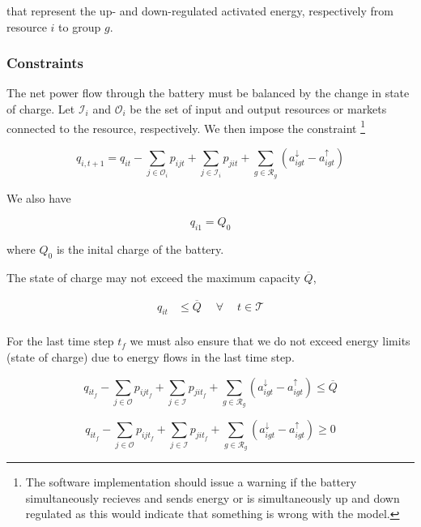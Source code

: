 \documentclass[]{report}
\newcommand{\resourcesg}{\mathcal{R}_g}
\newcommand{\timesteps}{\mathcal{T}}
\newcommand{\outputs}{\mathcal{O}}
\newcommand{\inputs}{\mathcal{I}}
\newcommand{\soc}{q}
\newcommand{\socinit}{Q_0}
\newcommand{\socmax}{\overline{Q}}
\newcommand{\socmin}{\underbar{Q}}
\newcommand{\aup}{a^{\uparrow}}
\newcommand{\adown}{a^{\downarrow}}
\let\oldforall\forall
\renewcommand{\forall}{\; \oldforall \: }
\begin{document}
that represent the up- and down-regulated activated energy, respectively from resource $i$ to group $g$.

\subsubsection*{Constraints}
The net power flow through the battery must be balanced by the change in state of charge. Let $\inputs_i$ and $\outputs_i$ be the set of input and output resources or markets connected to the resource, respectively. We then impose the constraint
\footnote{The software implementation should issue a warning if the battery simultaneously recieves and sends energy or is simultaneously up and down regulated as this would indicate that something is wrong with the model.}

\begin{equation}
    \label{eq:battery-energy-balance}
    \soc_{i,t+1} = \soc_{it} - \sum_{j \in \outputs_i} p_{ijt} + \sum_{j \in \inputs_i} p_{jit} + \sum_{g \in \resourcesg} (\adown_{igt} - \aup_{igt})
\end{equation}

We also have

\begin{equation}
    \soc_{i1} = \socinit
\end{equation}

where $\socinit$ is the inital charge of the battery.

The state of charge may not exceed the maximum capacity $\socmax$,

\begin{align}
    \soc_{it} &\leq \socmax \quad \forall \quad t \in \timesteps \\
\end{align}


For the last time step $t_f$ we must also ensure that we do not exceed energy limits (state of charge) due to energy flows in the last time step.

\begin{equation}
    \soc_{it_f} - \sum_{j \in \outputs} p_{ijt_f} + \sum_{j \in \inputs} p_{jit_f} + \sum_{g \in \resourcesg} (\adown_{igt} - \aup_{igt})\leq \socmax
\end{equation}

\begin{equation}
    \soc_{it_f} - \sum_{j \in \outputs} p_{ijt_f} + \sum_{j \in \inputs} p_{jit_f} + \sum_{g \in \resourcesg} (\adown_{igt} - \aup_{igt}) \geq 0
\end{equation}
\end{document}
